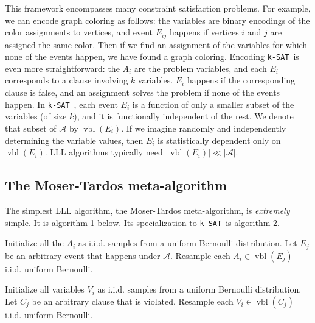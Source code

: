 \documentclass[twocolumn]{article}
\newcommand{\ksat}{\texttt{k-SAT}~}
\begin{document}
This framework encompasses many constraint satisfaction problems.  For example, we can encode graph coloring as follows: the variables are binary encodings of the color assignments to vertices, and event $E_{ij}$ happens if vertices $i$ and $j$ are assigned the same color.  Then if we find an assignment of the variables for which none of the events happen, we have found a graph coloring.  Encoding \ksat is even more straightforward: the $A_i$ are the problem variables, and each $E_i$ corresponds to a clause involving $k$ variables.  $E_i$ happens if the corresponding clause is false, and an assignment solves the problem if none of the events happen.  In \ksat, each event $E_i$ is a function of only a smaller subset of the variables (of size $k$), and it is functionally independent of the rest.  We denote that subset of $\mathcal{A}$ by $\operatorname{vbl}(E_i)$.  If we imagine randomly and independently determining the variable values, then $E_i$ is statistically dependent only on $\operatorname{vbl}(E_i)$.  LLL algorithms typically need $|\operatorname{vbl}(E_i)| \ll |\mathcal{A}|$.

\subsection{The Moser-Tardos meta-algorithm}
The simplest LLL algorithm, the Moser-Tardos meta-algorithm, is \emph{extremely} simple.  It is algorithm 1 below.  Its specialization to \ksat is algorithm 2.

\begin{algorithm}[H]
\label{alg:mt-meta}
\begin{algorithmic}[1]
\State Initialize all the $A_i$ as i.i.d. samples from a uniform Bernoulli distribution.
  \State Let $E_j$ be an arbitrary event that happens under $\mathcal{A}$.
  \State Resample each $A_i \in \operatorname{vbl}(E_j)$ i.i.d. uniform Bernoulli.
\EndWhile
\end{algorithmic}
\caption{The Moser-Tardos meta-algorithm.}
\end{algorithm}

\begin{algorithm}[H]
\label{alg:mt-ksat}
\begin{algorithmic}[1]
\State Initialize all variables $V_i$ as i.i.d. samples from a uniform Bernoulli distribution.
  \State Let $C_j$ be an arbitrary clause that is violated.
  \State Resample each $V_i \in \operatorname{vbl}(C_j)$ i.i.d. uniform Bernoulli.
\EndWhile
\end{algorithmic}
\caption{The Moser-Tardos meta-algorithm, specialized to \ksat.}
\end{algorithm}
\end{document}

